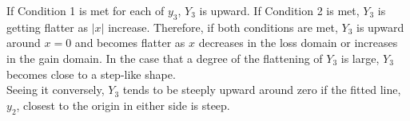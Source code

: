 \documentclass[11pt, a4paper]{article}
\begin{document}
If Condition 1 is met for each of $y_3$, $Y_3$ is upward. If Condition 2 is met, $Y_3$ is getting flatter as $|x|$ increase. Therefore, if both conditions are met, $Y_3$ is upward around $x=0$ and becomes flatter as $x$ decreases in the loss domain or increases in the gain domain. In the case that a degree of the flattening of $Y_3$ is large, $Y_3$ becomes close to a step-like shape.\\






Seeing it conversely, $Y_3$ tends to be steeply upward around zero if the fitted line, $y_2$, closest to the origin in either side is steep.

\end{document}
